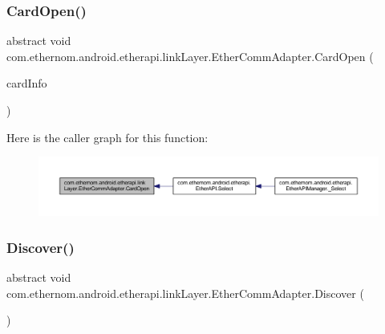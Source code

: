 \subsubsection{\texorpdfstring{Card\+Open()}{CardOpen()}}
{\footnotesize\ttfamily abstract void com.\+ethernom.\+android.\+etherapi.\+link\+Layer.\+Ether\+Comm\+Adapter.\+Card\+Open (\begin{DoxyParamCaption}\item[{\mbox{\hyperlink{classcom_1_1ethernom_1_1android_1_1etherapi_1_1_card_info}{Card\+Info}}}]{card\+Info }\end{DoxyParamCaption})\hspace{0.3cm}{\ttfamily [abstract]}}

Here is the caller graph for this function\+:\nopagebreak
\begin{figure}[H]
\begin{center}
\leavevmode
\includegraphics[width=350pt]{classcom_1_1ethernom_1_1android_1_1etherapi_1_1link_layer_1_1_ether_comm_adapter_af0899f88b78f1072650148201cd8bf1d_icgraph}
\end{center}
\end{figure}
\mbox{\label{classcom_1_1ethernom_1_1android_1_1etherapi_1_1link_layer_1_1_ether_comm_adapter_a9f7491d2b2afa68da62fafc5d89e360b}} 
\subsubsection{\texorpdfstring{Discover()}{Discover()}}
{\footnotesize\ttfamily abstract void com.\+ethernom.\+android.\+etherapi.\+link\+Layer.\+Ether\+Comm\+Adapter.\+Discover (\begin{DoxyParamCaption}{ }\end{DoxyParamCaption})\hspace{0.3cm}{\ttfamily [abstract]}}

